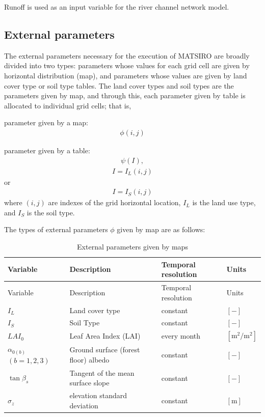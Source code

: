 Runoff is used as an input variable for the river channel network model.

\hypertarget{external-parameters}{%
\subsection{External parameters}\label{external-parameters}}

The external parameters necessary for the execution of MATSIRO are broadly divided into two types: parameters whose values for each grid cell are given by horizontal distribution (map), and parameters
whose values are given by land cover type or soil type tables. The land cover types and soil types are the parameters given by map, and through this, each parameter given by table is allocated to
individual grid cells; that is,

parameter given by a map: \begin{eqnarray}
 \phi(i,j)
\end{eqnarray}

parameter given by a table: \begin{eqnarray}
 \psi(I),
\end{eqnarray} \begin{eqnarray}
 I = I_L (i,j)
\end{eqnarray} or \begin{eqnarray}
 I = I_S (i,j)
\end{eqnarray} where \((i,j)\) are indexes of the grid horizontal location, \(I_L\) is the land use type, and \(I_S\) is the soil type.

The types of external parameters \(\phi\) given by map are as follows:

\begin{longtable}[]{@{}llll@{}}
\caption{External parameters given by maps}\tabularnewline
\toprule
Variable & Description & Temporal resolution & Units \\
\midrule
\endfirsthead
\toprule
Variable & Description & Temporal resolution & Units \\
\midrule
\endhead
\(I_L\) & Land cover type & constant & \(\mathrm{[-]}\) \\
\(I_S\) & Soil Type & constant & \(\mathrm{[-]}\) \\
\(LAI_0\) & Leaf Area Index (LAI) & every month & \(\mathrm{[m^2/m^2]}\) \\
\(\alpha_{0(b)}\) \((b=1,2,3)\) & Ground surface (forest floor) albedo & constant & \(\mathrm{[-]}\) \\
\(\tan\beta_{s}\) & Tangent of the mean surface slope & constant & \(\mathrm{[-]}\) \\
\(\sigma_z\) & elevation standard deviation & constant & \(\mathrm{[m]}\) \\
\bottomrule
\end{longtable}

